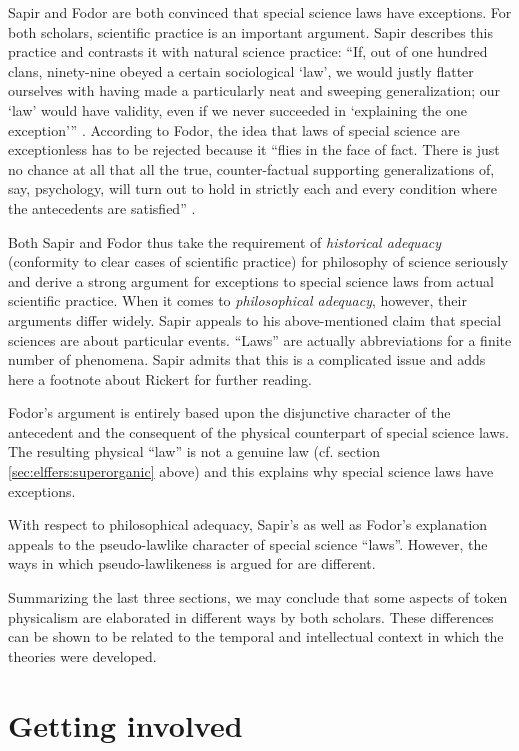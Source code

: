 \documentclass[output=paper]{langscibook}
\begin{document}
Sapir and Fodor are both convinced that special science laws have exceptions. For both scholars, scientific practice is an important argument. Sapir describes this practice and contrasts it with natural science practice: ``If, out of one  hundred clans, ninety-nine obeyed a certain sociological `law', we would justly flatter ourselves with having made a particularly neat and sweeping generalization; our `law' would have validity, even if we never succeeded in `explaining the one exception''' \citep[447]{Sapir1917}. According to Fodor, the idea that laws of special science are exceptionless has to be rejected because it ``flies in the face of fact. There is just no chance at all that all the true, counter-factual supporting generalizations of, say, psychology, will turn out to hold in strictly each and every condition where the antecedents are satisfied'' \citep[111]{Fodor1974}.

Both Sapir and Fodor thus take the requirement of \emph{historical adequacy} (conformity to clear cases of scientific practice) for philosophy of science seriously and derive a strong argument for exceptions to special science laws from actual scientific practice. When it comes to \emph{philosophical adequacy}, however, their arguments differ widely. Sapir appeals to his above-mentioned claim that special sciences are about particular events. ``Laws'' are actually abbreviations for a finite number of phenomena. Sapir admits that this is a complicated issue and adds here a footnote about Rickert for further reading.

Fodor's argument is entirely based upon the disjunctive character of the antecedent and the consequent of the physical counterpart of special science laws. The resulting physical ``law'' is not a genuine law (cf. section \ref{sec:elffers:superorganic} above) and this explains why special science laws have exceptions.

With respect to philosophical adequacy, Sapir's as well as Fodor's explanation appeals to the pseudo-lawlike character of special science ``laws''. However, the ways in which pseudo-lawlikeness is argued for are different.

Summarizing the last three sections, we may conclude that some aspects of token physicalism are elaborated in different ways by both scholars. These differences can be shown to be related to the temporal and intellectual context in which the theories were developed.

\section{Getting involved}
\label{sec:elffers:gettinginvolved}
\end{document}
